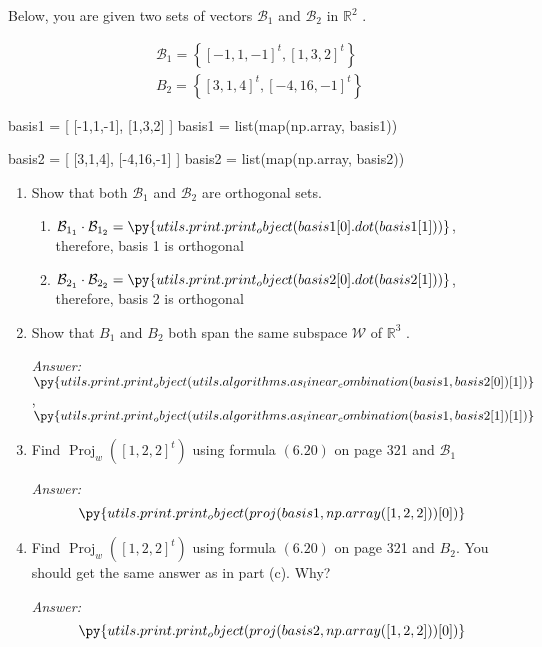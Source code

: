 \documentclass[letterpaper]{article}
\newcommand{\ans}{\textit{Answer: }}
\newenvironment{question}[2][Question]{\begin{trivlist}
\item[\hskip \labelsep {\bfseries #1}\hskip \labelsep {\bfseries #2.}]}{\end{trivlist}}
\newcommand{\printobj}[1]{\py{utils.print.print_object(#1)}}
\begin{document}
\begin{question}{6.20}
  Below, you are given two sets of vectors $\mathcal{B}_{1}$ and $\mathcal{B}_{2}$ in $\mathbb{R}^{2}$ .

  $$
  \begin{array}{l}{\mathcal{B}_{1}=\left\{[-1,1,-1]^{t},[1,3,2]^{t}\right\}} \\ {B_{2}=\left\{[3,1,4]^{t},[-4,16,-1]^{t}\right\}}\end{array}
  $$

  \begin{pycode}
basis1 = [
  [-1,1,-1],
  [1,3,2]
]
basis1 = list(map(np.array, basis1))

basis2 = [
  [3,1,4],
  [-4,16,-1]
]
basis2 = list(map(np.array, basis2))
  \end{pycode}

  \begin{enumerate}[label=(\alph*)]
    \item Show that both $\mathcal{B}_{1}$ and $\mathcal{B}_{2}$ are orthogonal sets.
    
    \begin{enumerate}
      \item $\mathcal{B}_{1_1} \cdot \mathcal{B}_{1_2} = \printobj{basis1[0].dot(basis1[1])}$,
      therefore, basis 1 is orthogonal
      \item $\mathcal{B}_{2_1} \cdot \mathcal{B}_{2_2} = \printobj{basis2[0].dot(basis2[1])}$,
      therefore, basis 2 is orthogonal
    \end{enumerate}

    \item Show that $B_{1}$ and $B_{2}$ both span the same subspace $\mathcal{W}$ of $\mathbb{R}^{3}$ .
    
    \ans 
    $\printobj{utils.algorithms.as_linear_combination(basis1, basis2[0])[1]}$,
    $\printobj{utils.algorithms.as_linear_combination(basis1, basis2[1])[1]}$

    \item Find $\operatorname{Proj}_{w}\left([1,2,2]^{t}\right)$ using formula $(6.20)$ on page 321 and $\mathcal{B}_{1}$
    
    \ans $$\printobj{proj(basis1, np.array([1,2,2]))[0]}$$

    \item Find $\operatorname{Proj}_{w}\left([1,2,2]^{t}\right)$ using formula $(6.20)$ on page 321 and $B_{2} .$ You
    should get the same answer as in part (c). Why?

    \ans $$\printobj{proj(basis2, np.array([1,2,2]))[0]}$$


\end{enumerate}
\end{question}
\end{document}
